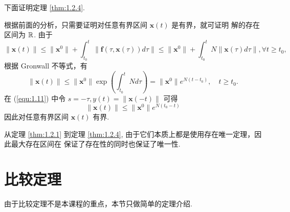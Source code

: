 下面证明定理 \ref{thm:1.2.4}.
\begin{pf1}
根据前面的分析，只需要证明对任意有界区间 $\bm{x}(t)$ 是有界，就可证明
解的存在区间为 $\mathbb{R}$.
由于
\begin{equation}\label{equ:1.11}
\|\bm{x}(t)\|\leq\|\bm{x}^0\|+\int_{t_0}^t\|\bm{f}(\tau,\bm{x}(\tau))d\tau\|\leq\|\bm{x}^0\|+\int_{t_0}^tN\|\bm{x}(\tau)d\tau\|,\forall t\geq t_0,
\end{equation}
根据 Gronwall 不等式，有
\[
\|\bm{x}(t)\|\leq\|\bm{x}^0\|\exp\left(\int_{t_0}^{t}Nd\tau\right)=\|\bm{x}^0\|e^{N(t-t_0)},\quad t\geq t_0.
\]
在 (\ref{equ:1.11}) 中令 $s=-\tau,y(t)=\|\bm{x}(-t)\|$ 可得
\[
\|\bm{x}(t)\|\leq\|\bm{x}^0\|e^{N(t_0-t)}
\]
因此对任意有界区间 $\bm{x}(t)$ 有界.
\end{pf1}
\begin{rmk}
从定理 \ref{thm:1.2.1} 到定理 \ref{thm:1.2.4}, 由于它们本质上都是使用存在唯一定理，因此最大存在区间在
保证了存在性的同时也保证了唯一性.
\end{rmk}

\section{比较定理}\label{sec:1.3}
由于比较定理不是本课程的重点，本节只做简单的定理介绍.

